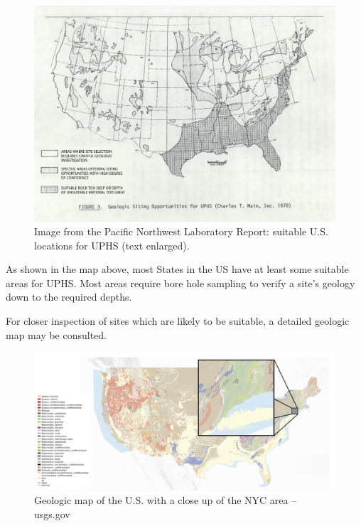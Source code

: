 \documentclass[hidelinks,12pt,a4paper]{article}
\begin{document}
\begin{figure}[ht!]
    \centering
    \includegraphics[width=1\textwidth]{pnl-report-geologic-siting-opportunities-for-uphs-text-overlay.jpg}
    \caption{Image from the Pacific Northwest Laboratory Report: suitable U.S. locations for UPHS (text enlarged). \cite{UndergroundPumpedHydroelectricStorage}}
\end{figure}
\FloatBarrier

As shown in the map above, most States in the US have at least some suitable areas for UPHS. Most areas require bore hole sampling to verify a site's geology down to the required depths.

For closer inspection of sites which are likely to be suitable, a detailed geologic map may be consulted.

\begin{figure}[ht!]
    \centering
    \includegraphics[width=1\textwidth]{usgs-gov-map-of-new-york-city-area.png}
    \caption{Geologic map of the U.S. with a close up of the NYC area -- usgs.gov \cite{MineralResourcesOnlineSpatialDataGeologicmaps}}
\end{figure}
\FloatBarrier
\end{document}

